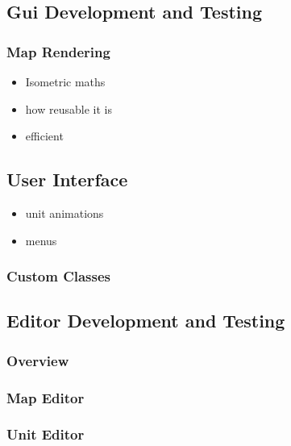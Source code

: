 \subsection{Gui Development and Testing}

\subsubsection{Map Rendering}
\label{ssub:map_rendering}

\begin{itemize}
	\item Isometric maths
	\item how reusable it is
	\item efficient 
\end{itemize}

\subsection{User Interface}

\begin{itemize}
	\item unit animations
	\item menus
\end{itemize}

\subsubsection{Custom Classes} %
\label{ssub:custom_classes}


\subsection{Editor Development and Testing}

\subsubsection{Overview}
\label{ssub:overview}

\subsubsection{Map Editor}
\label{ssub:map_editor}

\subsubsection{Unit Editor}
\label{ssub:unit_editors}

